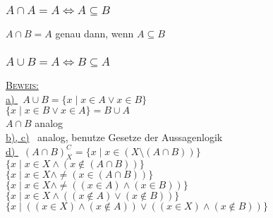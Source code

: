 \documentclass[10pt,a4paper,titlepage,fleqn]{article}
\begin{document}
\subsubsection{$A\cap A = A \Leftrightarrow A\subseteq B$}
	$A\cap B = A$ genau dann, wenn $A\subseteq B$\\
\subsubsection{$A\cup B = A \Leftrightarrow B\subseteq A$}
	\underline{\textsc{Beweis:}}\\
	\underline{\textsf{a) }} \ $A\cup B = \lbrace x \mid x\in A \vee x \in B \rbrace $\\
	 $\lbrace x \mid x\in B \vee x \in A \rbrace
	= B \cup A$\\
	$A\cap B$ analog\\
	\underline{\textsf{b), c)}} \ analog, benutze Gesetze der Aussagenlogik\\
	\underline{\textsf{d) }} \ ${(A \cap B)}^C_X = \lbrace x \mid x\in  (X \setminus 
	(A \cap B)) \rbrace$\\
	$\lbrace x \mid x\in X \wedge (x \not \in (A \cap B)) \rbrace$\\
	$\lbrace x \mid x\in X \wedge \neq (x \in (A \cap B)) \rbrace$\\
	$\lbrace x \mid x\in X \wedge \neq ((x \in A) \wedge (x \in B)) \rbrace$\\
	$\lbrace x \mid x\in X \wedge ((x \not \in A) \vee (x \not \in B)) \rbrace$\\
	$\lbrace x \mid ((x\in X) \wedge (x\not \in A)) \vee ((x \in X) 
	\wedge (x \not \in B)) \rbrace$\\
\end{document}
